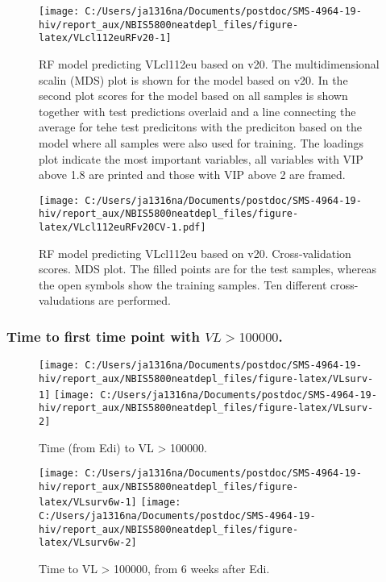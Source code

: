 \documentclass[
]{article}
\begin{document}
\begin{figure}
\texttt{[image: C:/Users/ja1316na/Documents/postdoc/SMS-4964-19-hiv/report\_aux/NBIS5800neatdepl\_files/figure-latex/VLcl112euRFv20-1]} \caption{RF model predicting VLcl112eu based on v20. The multidimensional scalin (MDS) plot is shown for the model based on v20. In the second plot scores for the model based on all samples is shown together with test predictions overlaid and a line connecting the average for tehe test predicitons with the prediciton based on the model where all samples were also used for training. The loadings plot indicate the most important variables, all variables with VIP above 1.8 are printed and those with VIP above 2 are framed.}\label{fig:VLcl112euRFv20}
\end{figure}

\begin{figure}
\centering
\texttt{[image: C:/Users/ja1316na/Documents/postdoc/SMS-4964-19-hiv/report\_aux/NBIS5800neatdepl\_files/figure-latex/VLcl112euRFv20CV-1.pdf]}
\caption{\label{fig:VLcl112euRFv20CV}RF model predicting VLcl112eu based on v20. Cross-validation scores. MDS plot. The filled points are for the test samples, whereas the open symbols show the training samples. Ten different cross-valudations are performed.}
\end{figure}

\FloatBarrier

\newpage

\hypertarget{time-to-first-time-point-with-vl-100000.}{%
\subsubsection{\texorpdfstring{Time to first time point with \(VL > 100000\).}{Time to first time point with VL \textgreater{} 100000.}}\label{time-to-first-time-point-with-vl-100000.}}

\begin{figure}
\texttt{[image: C:/Users/ja1316na/Documents/postdoc/SMS-4964-19-hiv/report\_aux/NBIS5800neatdepl\_files/figure-latex/VLsurv-1]} \texttt{[image: C:/Users/ja1316na/Documents/postdoc/SMS-4964-19-hiv/report\_aux/NBIS5800neatdepl\_files/figure-latex/VLsurv-2]} \caption{Time (from Edi) to VL > 100000.}\label{fig:VLsurv}
\end{figure}

\begin{figure}
\texttt{[image: C:/Users/ja1316na/Documents/postdoc/SMS-4964-19-hiv/report\_aux/NBIS5800neatdepl\_files/figure-latex/VLsurv6w-1]} \texttt{[image: C:/Users/ja1316na/Documents/postdoc/SMS-4964-19-hiv/report\_aux/NBIS5800neatdepl\_files/figure-latex/VLsurv6w-2]} \caption{Time to VL > 100000, from 6 weeks after Edi.}\label{fig:VLsurv6w}
\end{figure}
\end{document}
